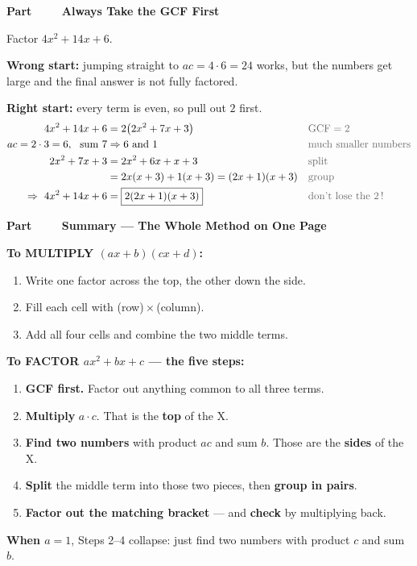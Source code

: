 \documentclass[11pt]{article}
\newcounter{partnum}
\newcommand{\partbanner}[1]{%
  \stepcounter{partnum}%
  \vspace{8pt}\par\noindent
  \begin{tcolorbox}[colback=primary,colframe=primary,arc=2pt,
    left=10pt,right=10pt,top=5pt,bottom=5pt,boxrule=0pt]
  {\color{accent}\bfseries Part \thepartnum\ \ \textbullet\ \ }{\color{white}\bfseries\large #1}
  \end{tcolorbox}\par\vspace{3pt}}
\begin{document}
\partbanner{Always Take the GCF First}

\begin{exbox}
Factor $4x^2 + 14x + 6$.

\vspace{3pt}
\textbf{Wrong start:} jumping straight to $ac = 4\cdot 6 = 24$ works, but the numbers get large
and the final answer is not fully factored.

\vspace{3pt}
\textbf{Right start:} every term is even, so pull out $2$ first.
\begin{align*}
4x^2 + 14x + 6 &= 2\big(2x^2 + 7x + 3\big) &&\color{reasonclr}\text{GCF} = 2\\
ac = 2\cdot 3 = 6,\ \ \text{sum } 7 &\Rightarrow 6 \text{ and } 1 &&\color{reasonclr}\text{much smaller numbers}\\
2x^2+7x+3 &= 2x^2+6x+x+3 &&\color{reasonclr}\text{split}\\
&= 2x(x+3) + 1(x+3) = (2x+1)(x+3) &&\color{reasonclr}\text{group}\\
\Rightarrow\ 4x^2+14x+6 &= \boxed{2(2x+1)(x+3)} &&\color{reasonclr}\text{don't lose the } 2\,!
\end{align*}
\end{exbox}

\newpage
\partbanner{Summary --- The Whole Method on One Page}

\begin{keybox}
\textbf{To MULTIPLY $(ax+b)(cx+d)$:}
\begin{enumerate}[nosep,leftmargin=1.7em]
\item Write one factor across the top, the other down the side.
\item Fill each cell with (row)\,$\times$\,(column).
\item Add all four cells and combine the two middle terms.
\end{enumerate}
\medskip

\textbf{To FACTOR $ax^2+bx+c$ --- the five steps:}
\begin{enumerate}[nosep,leftmargin=1.7em]
\item \textbf{GCF first.} Factor out anything common to all three terms.
\item \textbf{Multiply} $a \cdot c$. That is the \textbf{top} of the X.
\item \textbf{Find two numbers} with product $ac$ and sum $b$. Those are the \textbf{sides} of the X.
\item \textbf{Split} the middle term into those two pieces, then \textbf{group in pairs}.
\item \textbf{Factor out the matching bracket} --- and \textbf{check} by multiplying back.
\end{enumerate}
\medskip

\textbf{When $a = 1$}, Steps 2--4 collapse: just find two numbers with product $c$ and sum $b$.
\end{keybox}
\end{document}
